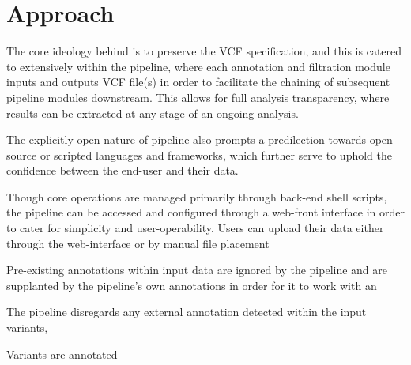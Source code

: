 
\section{Approach}

The core ideology behind \app is to preserve the VCF specification, and this is catered to extensively within the pipeline, where each annotation and filtration module inputs and outputs VCF file(s) in order to facilitate the chaining of subsequent pipeline modules downstream. This allows for full analysis transparency, where results can be extracted at any stage of an ongoing analysis. 

The explicitly open nature of pipeline also prompts a predilection towards open-source or scripted languages and frameworks, which further serve to uphold the confidence between the end-user and their data.

Though core operations are managed primarily through back-end shell scripts, the pipeline can be accessed and configured through a web-front interface  in order to cater for simplicity and user-operability. Users can upload their data either through the web-interface or by manual file placement

Pre-existing annotations within input data are ignored by the pipeline and are supplanted by the pipeline's own annotations in order for it to work with an 

The pipeline disregards any external annotation detected within the input variants, 

Variants are annotated 

